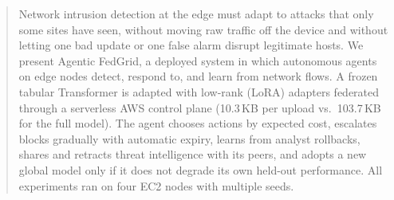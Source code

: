 
\begin{abstract}
Network intrusion detection at the edge must adapt to attacks that only some
sites have seen, without moving raw traffic off the device and without letting
one bad update or one false alarm disrupt legitimate hosts. We present
Agentic FedGrid, a deployed system in which autonomous agents on edge nodes
detect, respond to, and learn from network flows. A frozen tabular Transformer
is adapted with low-rank (LoRA) adapters federated through a serverless AWS
control plane (10.3\,KB per upload vs.\ 103.7\,KB for the full model). The
agent chooses actions by expected cost, escalates blocks gradually with
automatic expiry, learns from analyst rollbacks, shares and retracts threat
intelligence with its peers, and adopts a new global model only if it does
not degrade its own held-out performance. All experiments ran on four EC2
nodes with multiple seeds.


\end{abstract}
